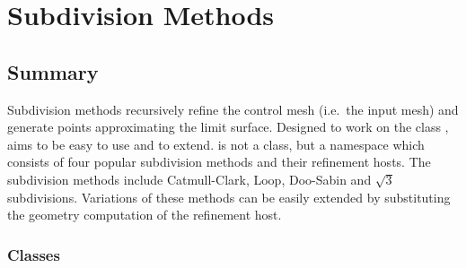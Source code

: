 
\chapter{Subdivision Methods}
\label{chapterSubdivisionRef}


\section*{Summary}

Subdivision methods recursively refine the control mesh 
(i.e.~the input mesh) and generate points approximating 
the limit surface. 
Designed to work on the class ,
 aims to be easy to use and to extend.
 is not a class, but a namespace 
which consists of four popular subdivision methods and their refinement
hosts. The subdivision methods include Catmull-Clark, Loop, Doo-Sabin and 
$\sqrt{3}$ subdivisions. Variations of these methods can be easily 
extended by substituting the geometry computation of the refinement
host.


\subsection*{Classes}


